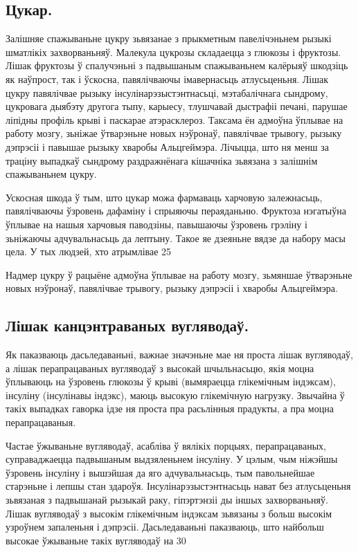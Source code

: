 \subsection{Цукар.}
Залішняе спажываньне цукру зьвязанае з прыкметным павелічэньнем рызыкі шматлікіх захворваньняў. Малекула цукрозы складаецца з глюкозы і фруктозы. Лішак фруктозы ў спалучэньні з падвышаным спажываньнем калёрыяў шкодзіць як наўпрост, так і ўскосна, павялічваючы імавернасьць атлусьценьня. Лішак цукру павялічвае рызыку інсулінарэзыстэнтнасьці, мэтабалічнага сындрому, цукровага дыябэту другога тыпу, карыесу, тлушчавай дыстрафіі печані, парушае ліпідны профіль крыві і паскарае атэрасклероз. Таксама ён адмоўна ўплывае на работу мозгу, зьніжае ўтварэньне новых нэўронаў, павялічвае трывогу, рызыку дэпрэсіі і павышае рызыку хваробы Альцгеймэра. Лічыцца, што ня менш за траціну выпадкаў сындрому раздражнёнага кішачніка зьвязана з залішнім спажываньнем цукру.

Ускосная шкода ў тым, што цукар можа фармаваць харчовую залежнасьць, павялічваючы ўзровень дафаміну і спрыяючы пераяданьню. Фруктоза нэгатыўна ўплывае на нашыя харчовыя паводзіны, павышаючы ўзровень грэліну і зьніжаючы адчувальнасьць да лептыну. Такое яе дзеяньне вядзе да набору масы цела. У тых людзей, хто атрымлівае 25%

Надмер цукру ў рацыёне адмоўна ўплывае на работу мозгу, зьмяншае ўтварэньне новых нэўронаў, павялічвае трывогу, рызыку дэпрэсіі і хваробы Альцгеймэра.

\subsection{Лішак канцэнтраваных вугляводаў.}
Як паказваюць дасьледаваньні, важнае значэньне мае ня проста лішак вугляводаў, а лішак перапрацаваных вугляводаў з высокай шчыльнасьцю, якія моцна ўплываюць на ўзровень глюкозы ў крыві (вымяраецца глікемічным індэксам), інсуліну (інсулінавы індэкс), маюць высокую глікемічную нагрузку. Звычайна ў такіх выпадках гаворка ідзе ня проста пра расьлінныя прадукты, а пра моцна перапрацаваныя.

Частае ўжываньне вугляводаў, асабліва ў вялікіх порцыях, перапрацаваных, суправаджаецца падвышаным выдзяленьнем інсуліну. У цэлым, чым ніжэйшы ўзровень інсуліну і вышэйшая да яго адчувальнасьць, тым павольнейшае старэньне і лепшы стан здароўя. Інсулінарэзыстэнтнасьць нават без атлусьценьня зьвязаная з падвышанай рызыкай раку, гіпэртэнзіі ды іншых захворваньняў. Лішак вугляводаў з высокім глікемічным індэксам зьвязаны з больш высокім узроўнем запаленьня і дэпрэсіі. Дасьледаваньні паказваюць, што найбольш высокае ўжываньне такіх вугляводаў на 30%

